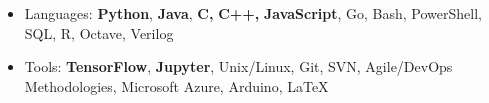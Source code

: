 

\begin{cvparagraph}

\begin{itemize}
\item {Languages:  \textbf{Python}, \textbf{Java}, \textbf{C,} \textbf{C++,} \textbf{\textbf{Java}Script}, Go, Bash, PowerShell, SQL, R, Octave, Verilog}
\item {Tools:  \textbf{TensorFlow},  \textbf{Jupyter}, Unix/Linux, Git, SVN, Agile/DevOps Methodologies, Microsoft Azure, Arduino, \LaTeX}
\end{itemize}
\end{cvparagraph}


